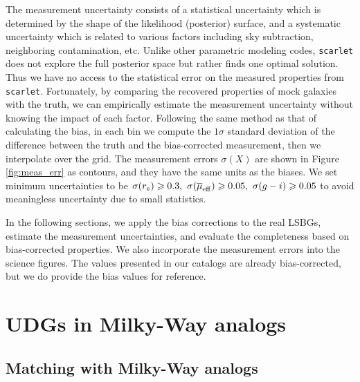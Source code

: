 \documentclass[twocolumn,astrosymb,twocolappendix]{aastex631}
\newcommand{\code}[1]{\texttt{#1}}
\begin{document}
\begin{CJK*}{UTF8}{gbsn}
The measurement uncertainty consists of a statistical uncertainty which is determined by the shape of the likelihood (posterior) surface, and a systematic uncertainty which is related to various factors including sky subtraction, neighboring contamination, etc. Unlike other parametric modeling codes, \code{scarlet} does not explore the full posterior space but rather finds one optimal solution. Thus we have no access to the statistical error on the measured properties from \code{scarlet}. Fortunately, by comparing the recovered properties of mock galaxies with the truth, we can empirically estimate the measurement uncertainty without knowing the impact of each factor. Following the same method as that of calculating the bias, in each bin we compute the $1\sigma$ standard deviation of the difference between the truth and the bias-corrected measurement, then we interpolate over the grid. The measurement errors $\sigma(X)$ are shown in Figure \ref{fig:meas_err} as contours, and they have the same units as the biases. We set minimum uncertainties to be $\sigma(r_e) \geqslant 0.3,\ \sigma(\overline{\mu}_{\rm eff}) \geqslant 0.05,\ \sigma(g-i) \geqslant 0.05$ to avoid meaningless uncertainty due to small statistics.

In the following sections, we apply the bias corrections to the real LSBGs, estimate the measurement uncertainties, and evaluate the completeness based on bias-corrected properties. We also incorporate the measurement errors into the science figures. The values presented in our catalogs are already bias-corrected, but we do provide the bias values for reference. 




\section{UDGs in Milky-Way analogs}

\subsection{Matching with Milky-Way analogs}\label{sec:match}


\end{CJK*}
\end{document}
